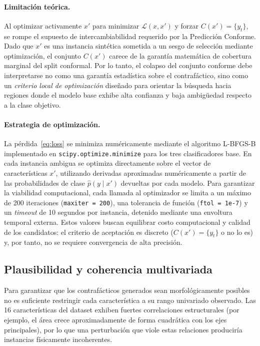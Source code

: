 \documentclass[conference]{IEEEtran}
\begin{document}
\paragraph{Limitación teórica.}
Al optimizar activamente $x'$ para minimizar $\mathcal{L}(x, x')$ y
forzar $C(x') = \{y_t\}$, se rompe el supuesto de intercambiabilidad
requerido por la Predicción Conforme. Dado que $x'$ es una instancia
sintética sometida a un sesgo de selección mediante optimización, el
conjunto $C(x')$ carece de la garantía matemática de cobertura marginal
del split conformal. Por lo tanto, el colapso del conjunto conforme debe
interpretarse no como una garantía estadística sobre el contrafáctico,
sino como un \emph{criterio local de optimización} diseñado para orientar
la búsqueda hacia regiones donde el modelo base exhibe alta confianza y
baja ambigüedad respecto a la clase objetivo.

\paragraph{Estrategia de optimización.}
La pérdida~\eqref{eq:loss} se minimiza numéricamente mediante el
algoritmo L-BFGS-B implementado en \texttt{scipy.optimize.minimize} para
los tres clasificadores base. En cada instancia ambigua se optimiza
directamente sobre el vector de características $x'$, utilizando
derivadas aproximadas numéricamente a partir de las probabilidades de
clase $\hat{p}(y \mid x')$ devueltas por cada modelo. Para garantizar
la viabilidad computacional, cada llamada al optimizador se limita a un
máximo de 200 iteraciones (\texttt{maxiter = 200}), una tolerancia de
función (\texttt{ftol = 1e-7}) y un \textit{timeout} de 10 segundos por
instancia, detenido mediante una envoltura temporal externa. Estos valores
buscan equilibrar costo computacional y calidad de los candidatos: el
criterio de aceptación es discreto ($C(x') = \{y_t\}$ o no lo es) y, por
tanto, no se requiere convergencia de alta precisión.

\subsection{Plausibilidad y coherencia multivariada}

Para garantizar que los contrafácticos generados sean morfológicamente
posibles no es suficiente restringir cada característica a su rango
univariado observado. Las 16 características del dataset exhiben
fuertes correlaciones estructurales (por ejemplo, el área crece
aproximadamente de forma cuadrática con los ejes principales), por lo
que una perturbación que viole estas relaciones produciría instancias
físicamente incoherentes.
\end{document}
